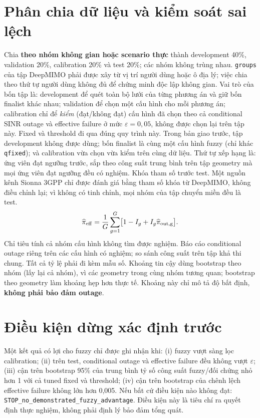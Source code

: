 \documentclass[conference,onecolumn,10pt]{IEEEtran}
\begin{document}
\section{Phân chia dữ liệu và kiểm soát sai lệch}
Chia \textbf{theo nhóm không gian hoặc scenario thực} thành development 40\%, validation 20\%, calibration 20\% và test 20\%; các nhóm không trùng nhau. \texttt{groups} của tập DeepMIMO phải được xây từ vị trí người dùng hoặc ô địa lý; việc chia theo thứ tự người dùng không đủ để chứng minh độc lập không gian. Vai trò của bốn tập là: development để quét toàn bộ lưới của từng phương án và giữ bốn finalist khác nhau; validation để chọn một cấu hình cho mỗi phương án; calibration chỉ để \emph{kiểm} (đạt/không đạt) cấu hình đã chọn theo cả conditional SINR outage và effective failure ở mức $\varepsilon=0{,}05$, không được chọn lại trên tập này. Fixed và threshold đi qua đúng quy trình này. Trong bản giao trước, tập development không được dùng; bốn finalist là cùng một cấu hình fuzzy (chỉ khác \texttt{qfixed}); và calibration vừa chọn vừa kiểm trên cùng dữ liệu. Thứ tự xếp hạng là: ứng viên đạt ngưỡng trước, sắp theo công suất trung bình trên tập geometry mà mọi ứng viên đạt ngưỡng đều có nghiệm. Khóa tham số trước test. Một nguồn kênh Sionna 3GPP chỉ được đánh giá bằng tham số khóa từ DeepMIMO, không điều chỉnh lại; vì không có tinh chỉnh, mọi nhóm của tập chuyển miền đều là test.
\begin{equation}
\widehat\pi_{\rm eff}=\frac1G\sum_{g=1}^G\bigl[1-I_g+I_g\widehat\pi_{\rm out,g}\bigr].
\end{equation}
Chỉ tiêu tính cả nhóm cấu hình không tìm được nghiệm. Báo cáo conditional outage riêng trên các cấu hình có nghiệm; so sánh công suất trên tập khả thi chung. Tất cả tỷ lệ phải đi kèm mẫu số. Khoảng tin cậy dùng bootstrap theo nhóm (lấy lại cả nhóm), vì các geometry trong cùng nhóm tương quan; bootstrap theo geometry làm khoảng hẹp hơn thực tế. Khoảng này chỉ mô tả độ bất định, \textbf{không phải bảo đảm outage}.

\section{Điều kiện dừng xác định trước}
Một kết quả có lợi cho fuzzy chỉ được ghi nhận khi: (i) fuzzy vượt sàng lọc calibration; (ii) trên test, conditional outage và effective failure đều không vượt $\varepsilon$; (iii) cận trên bootstrap 95\% của trung bình tỷ số công suất fuzzy/đối chứng nhỏ hơn 1 với cả tuned fixed và threshold; (iv) cận trên bootstrap của chênh lệch effective failure không lớn hơn 0,005. Nếu bất cứ điều kiện nào không đạt: \texttt{STOP\_no\_demonstrated\_fuzzy\_advantage}. Điều kiện này là tiêu chí ra quyết định thực nghiệm, không phải định lý bảo đảm tổng quát.
\end{document}
